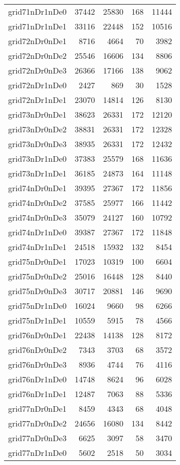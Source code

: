 \begin{longtable}{lrrrr}
grid71nDr1nDe0 & 37442 & 25830 & 168 & 11444 \\
grid71nDr1nDe1 & 33116 & 22448 & 152 & 10516 \\
grid72nDr0nDe1 & 8716 & 4664 & 70 & 3982 \\
grid72nDr0nDe2 & 25546 & 16606 & 134 & 8806 \\
grid72nDr0nDe3 & 26366 & 17166 & 138 & 9062 \\
grid72nDr1nDe0 & 2427 & 869 & 30 & 1528 \\
grid72nDr1nDe1 & 23070 & 14814 & 126 & 8130 \\
grid73nDr0nDe1 & 38623 & 26331 & 172 & 12120 \\
grid73nDr0nDe2 & 38831 & 26331 & 172 & 12328 \\
grid73nDr0nDe3 & 38935 & 26331 & 172 & 12432 \\
grid73nDr1nDe0 & 37383 & 25579 & 168 & 11636 \\
grid73nDr1nDe1 & 36185 & 24873 & 164 & 11148 \\
grid74nDr0nDe1 & 39395 & 27367 & 172 & 11856 \\
grid74nDr0nDe2 & 37585 & 25977 & 166 & 11442 \\
grid74nDr0nDe3 & 35079 & 24127 & 160 & 10792 \\
grid74nDr1nDe0 & 39387 & 27367 & 172 & 11848 \\
grid74nDr1nDe1 & 24518 & 15932 & 132 & 8454 \\
grid75nDr0nDe1 & 17023 & 10319 & 100 & 6604 \\
grid75nDr0nDe2 & 25016 & 16448 & 128 & 8440 \\
grid75nDr0nDe3 & 30717 & 20881 & 146 & 9690 \\
grid75nDr1nDe0 & 16024 & 9660 & 98 & 6266 \\
grid75nDr1nDe1 & 10559 & 5915 & 78 & 4566 \\
grid76nDr0nDe1 & 22438 & 14138 & 128 & 8172 \\
grid76nDr0nDe2 & 7343 & 3703 & 68 & 3572 \\
grid76nDr0nDe3 & 8936 & 4744 & 76 & 4116 \\
grid76nDr1nDe0 & 14748 & 8624 & 96 & 6028 \\
grid76nDr1nDe1 & 12487 & 7063 & 88 & 5336 \\
grid77nDr0nDe1 & 8459 & 4343 & 68 & 4048 \\
grid77nDr0nDe2 & 24656 & 16080 & 134 & 8442 \\
grid77nDr0nDe3 & 6625 & 3097 & 58 & 3470 \\
grid77nDr1nDe0 & 5602 & 2518 & 50 & 3034 \\

\end{longtable}
